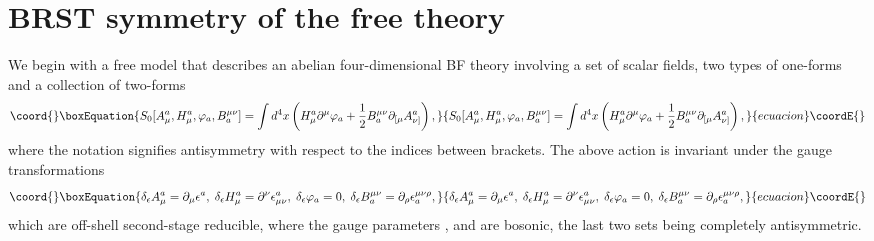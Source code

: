 \documentclass[a4paper,12pt]{article}
\begin{document}
\section{BRST symmetry of the free theory}

We begin with a free model that describes an abelian four-dimensional BF
theory involving a set of scalar fields, two types of one-forms and a
collection of two-forms 
\begin{equation}\coord{}\boxEquation{
S_{0}[A_{\mu }^{a},H_{\mu }^{a},\varphi _{a},B_{a}^{\mu \nu }]=\int
d^{4}x\left( H_{\mu }^{a}\partial ^{\mu }\varphi _{a}+\frac{1}{2}B_{a}^{\mu
\nu }\partial _{[\mu }A_{\nu ]}^{a}\right) ,  \label{xx1}
}{
S_{0}[A_{\mu }^{a},H_{\mu }^{a},\varphi _{a},B_{a}^{\mu \nu }]=\int
d^{4}x\left( H_{\mu }^{a}\partial ^{\mu }\varphi _{a}+\frac{1}{2}B_{a}^{\mu
\nu }\partial _{[\mu }A_{\nu ]}^{a}\right) ,  }{ecuacion}\coordE{}\end{equation}
where the notation \myHighlight{$\left[ \mu \nu \right] $}\coordHE{} signifies antisymmetry with
respect to the indices between brackets. The above action is invariant under
the gauge transformations 
\begin{equation}\coord{}\boxEquation{
\delta _{\epsilon }A_{\mu }^{a}=\partial _{\mu }\epsilon ^{a},\;\delta
_{\epsilon }H_{\mu }^{a}=\partial ^{\nu }\epsilon _{\mu \nu }^{a},\;\delta
_{\epsilon }\varphi _{a}=0,\;\delta _{\epsilon }B_{a}^{\mu \nu }=\partial
_{\rho }\epsilon _{a}^{\mu \nu \rho },  \label{xxgauge}
}{
\delta _{\epsilon }A_{\mu }^{a}=\partial _{\mu }\epsilon ^{a},\;\delta
_{\epsilon }H_{\mu }^{a}=\partial ^{\nu }\epsilon _{\mu \nu }^{a},\;\delta
_{\epsilon }\varphi _{a}=0,\;\delta _{\epsilon }B_{a}^{\mu \nu }=\partial
_{\rho }\epsilon _{a}^{\mu \nu \rho },  }{ecuacion}\coordE{}\end{equation}
which are off-shell second-stage reducible, where the gauge parameters \coordHE{}, \coordHE{} and \coordHE{} are bosonic, the last two sets being completely antisymmetric.
\end{document}
